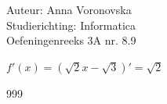 \documentclass[a4paper]{article}
\begin{document}
\noindent \large Auteur: Anna Voronovska \\
\noindent \large Studierichting: Informatica \\
\noindent \large Oefeningenreeks 3A nr. 8.9 \\

\bigskip 

\normalsize

$f'(x) = \left( \sqrt{2}x - \sqrt{3} \right)' = \sqrt{2}$



\begin{thebibliography}{999}
\end{thebibliography}
\end{document}
